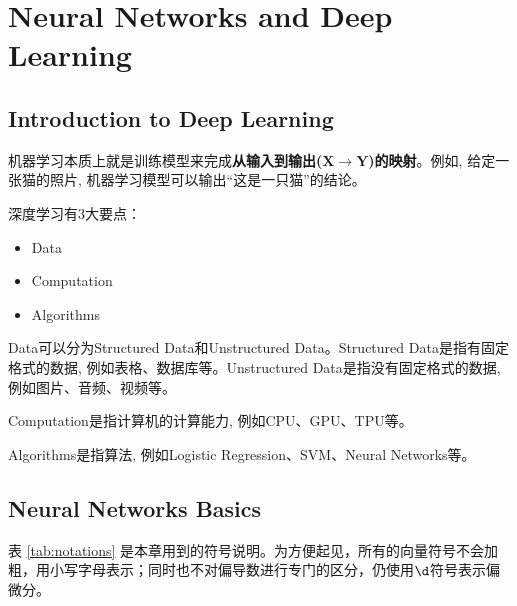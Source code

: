 \chapter{Neural Networks and Deep Learning}

\section{Introduction to Deep Learning}
机器学习本质上就是训练模型来完成\textbf{从输入到输出($\bm{X\to Y}$)的映射}。例如, 给定一张猫的照片, 机器学习模型可以输出``这是一只猫''的结论。

深度学习有3大要点：
\begin{itemize}	
    \item Data
    \item Computation
    \item Algorithms
\end{itemize}

Data可以分为Structured Data和Unstructured Data。Structured Data是指有固定格式的数据, 例如表格、数据库等。Unstructured Data是指没有固定格式的数据, 例如图片、音频、视频等。

Computation是指计算机的计算能力, 例如CPU、GPU、TPU等。

Algorithms是指算法, 例如Logistic Regression、SVM、Neural Networks等。

\section{Neural Networks Basics}

表 \ref{tab:notations} 是本章用到的符号说明。为方便起见，所有的向量符号不会加粗，用小写字母表示；同时也不对偏导数进行专门的区分，仍使用$\d $符号表示偏微分。

